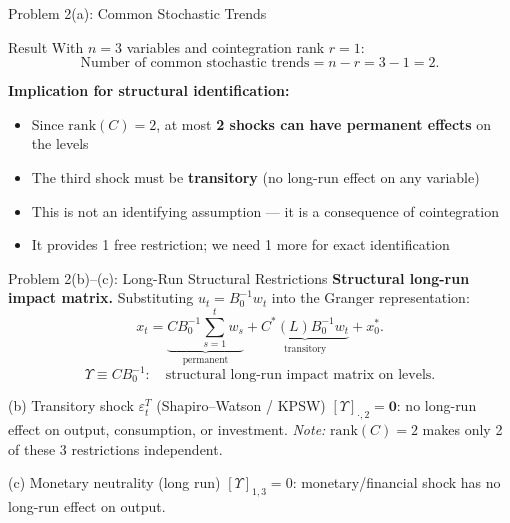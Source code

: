 \documentclass[aspectratio=169,11pt]{beamer}
\newcommand{\rank}{\mathrm{rank}}
\begin{document}
\begin{frame}{Problem 2(a): Common Stochastic Trends}
    \begin{alertblock}{Result}
        With $n = 3$ variables and cointegration rank $r = 1$:
        \[
        \text{Number of common stochastic trends} = n - r = 3 - 1 = 2.
        \]
    \end{alertblock}

    \vspace{0.3em}
    \textbf{Implication for structural identification:}
    \begin{itemize}
        \item Since $\rank(C) = 2$, at most \textbf{2 shocks can have permanent effects} on the levels
        \item The third shock must be \textbf{transitory} (no long-run effect on any variable)
        \item This is \textcolor{mitred}{not an identifying assumption} --- it is a consequence of cointegration
        \item It provides 1 free restriction; we need 1 more for exact identification
    \end{itemize}
\end{frame}

\begin{frame}{Problem 2(b)--(c): Long-Run Structural Restrictions}
    \textbf{Structural long-run impact matrix.} Substituting $u_t = B_0^{-1}w_t$ into the Granger representation:
    \[
    x_t = \underbrace{CB_0^{-1}\sum_{s=1}^t w_s}_{\text{permanent}} + \underbrace{C^*(L)B_0^{-1}w_t}_{\text{transitory}} + x_0^*.
    \]
    \[
    \Upsilon \equiv CB_0^{-1}: \quad \text{structural long-run impact matrix on levels.}
    \]

    \begin{alertblock}{(b) Transitory shock $\varepsilon_t^T$ (Shapiro--Watson / KPSW)}
        $[\Upsilon]_{\cdot,2} = \mathbf{0}$: no long-run effect on output, consumption, or investment.
        \textit{Note:} $\rank(C)=2$ makes only 2 of these 3 restrictions independent.
    \end{alertblock}

    \begin{alertblock}{(c) Monetary neutrality (long run)}
        $[\Upsilon]_{1,3} = 0$: monetary/financial shock has no long-run effect on output.
    \end{alertblock}
\end{frame}
\end{document}
